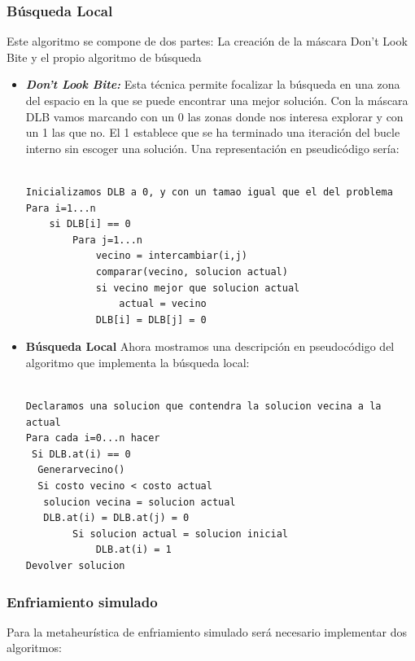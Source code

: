 		\subsubsection{Búsqueda Local}
		Este algoritmo se compone de dos partes: La creación de la máscara Don't Look Bite y el propio algoritmo de búsqueda
		
		\begin{itemize}
			\item\textit{\textbf{ Don't Look Bite:}}
			Esta técnica permite focalizar la búsqueda en una zona del espacio en la que se puede encontrar una mejor solución. Con la máscara DLB vamos marcando con un 0 las zonas donde nos interesa explorar y con un 1 las que no. El 1 establece que se ha terminado una iteración del bucle interno sin escoger una solución.
			\newpage
			Una representación en pseudicódigo sería:
			
					\begin{lstlisting}[language=SH]
					
Inicializamos DLB a 0, y con un tamao igual que el del problema
Para i=1...n
	si DLB[i] == 0
		Para j=1...n
			vecino = intercambiar(i,j)
			comparar(vecino, solucion actual)
			si vecino mejor que solucion actual
				actual = vecino
			DLB[i] = DLB[j] = 0
					\end{lstlisting}
					
			\item \textbf{Búsqueda Local}
			Ahora mostramos una descripción en pseudocódigo del algoritmo que implementa la búsqueda local:
			
		\begin{lstlisting}[language=SH]
		
Declaramos una solucion que contendra la solucion vecina a la actual
Para cada i=0...n hacer
 Si DLB.at(i) == 0
  Generarvecino()
  Si costo vecino < costo actual
   solucion vecina = solucion actual
   DLB.at(i) = DLB.at(j) = 0
		Si solucion actual = solucion inicial
			DLB.at(i) = 1
Devolver solucion
	\end{lstlisting}
			
		\end{itemize}
		\subsubsection{Enfriamiento simulado}
		Para la metaheurística de enfriamiento simulado será necesario implementar dos algoritmos:
		
